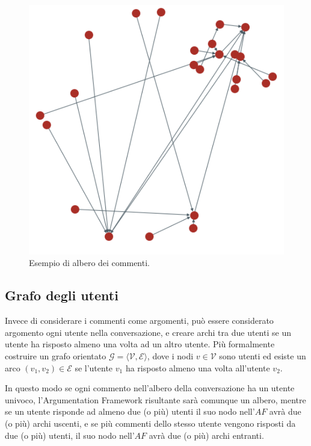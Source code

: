 \begin{figure}[h]
    \includegraphics[width=\linewidth]{Immagini/comments-tree.png}
    \caption{Esempio di albero dei commenti.}
    \label{fig:comments-tree}
\end{figure}

\subsection{Grafo degli utenti}
\label{subsection:grafo_utenti}
Invece di considerare i commenti come argomenti, può essere considerato argomento ogni utente nella conversazione, e creare archi tra due utenti se un utente ha risposto almeno una volta ad un altro utente. Più formalmente costruire un grafo orientato $\mathcal{G = ⟨V, E⟩}$, dove i nodi $v \in \mathcal{V}$ sono utenti ed esiste un arco $(v_1,v_2) \in \mathcal{E}$ se l'utente $v_1$ ha risposto almeno una volta all'utente $v_2$.

In questo modo se ogni commento nell'albero della conversazione ha un utente univoco, l'Argumentation Framework risultante sarà comunque un albero, mentre se un utente risponde ad almeno due (o più) utenti il suo nodo nell'$AF$ avrà due (o più) archi uscenti, e se più commenti dello stesso utente vengono risposti da due (o più) utenti, il suo nodo nell'$AF$ avrà due (o più) archi entranti.

